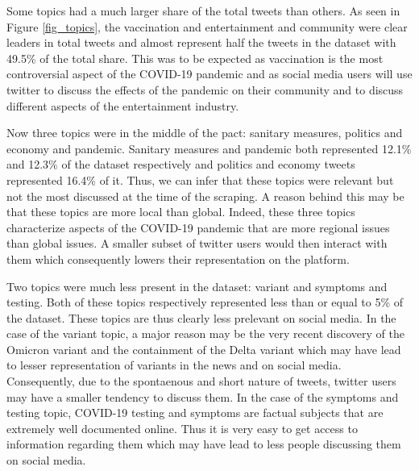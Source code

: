 \documentclass[letterpaper]{article} %
\begin{document}


Some topics had a much larger share of the total tweets than others. As seen in
Figure \ref{fig_topics}, the vaccination and entertainment and community were clear leaders in total tweets and almost represent half the tweets in the dataset with 49.5\% of the total share. This was to be expected as vaccination is the most controversial aspect of the COVID-19 pandemic and as social media users will use twitter to discuss the effects of the pandemic on their community and to discuss different aspects of the entertainment industry. 

Now three topics were in the middle of the pact: sanitary measures, politics and economy and pandemic. Sanitary measures and pandemic both represented 12.1\% and 12.3\% of the dataset respectively and politics and economy tweets represented 16.4\% of it. Thus, we can infer that these topics were relevant but not the most discussed at the time of the scraping. A reason behind this may be that these topics are more local than global. Indeed, these three topics characterize aspects of the COVID-19 pandemic that are more regional issues than global issues. A smaller subset of twitter users would then interact with them which consequently lowers their representation on the platform. 

Two topics were much less present in the dataset: variant and symptoms and testing. Both of these topics respectively represented less than or equal to 5\% of the dataset. These topics are thus clearly less prelevant on social media. In the case of the variant topic,  a major reason may be the very recent discovery of the Omicron variant and the containment of the Delta variant which may have lead to lesser representation of variants in the news and on social media. Consequently, due to the spontaenous and short nature of tweets, twitter users may have a smaller tendency to discuss them. In the case of the symptoms and testing topic, COVID-19 testing and symptoms are factual subjects that are extremely well documented online. Thus it is very easy to get access to information regarding them which may have lead to less people discussing them on social media.
\end{document}
